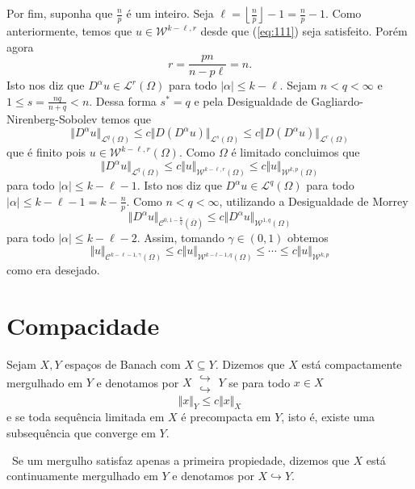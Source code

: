 \documentclass[a4paper, 11pt]{book}
\theoremstyle{definition}
\newcommand{\obs}{\noindent{\textbf{\textcolor{black}{\sffamily Observação:}}}~}
\newcommand{\cC}{\mathcal{C}}
\newcommand{\cL}{\mathcal{L}}
\newcommand{\cW}{\mathcal{W}}
\newcommand{\doublehookrightarrow}{\;\substack{\hookrightarrow \\ \hookrightarrow}\;}
\begin{document}
\begin{prf}
    Por fim, suponha que $\frac{n}{p}$ é um inteiro. Seja $\ell = \left\lfloor \frac{n}{p} \right\rfloor - 1 = \frac{n}{p} - 1$.
    Como anteriormente, temos que $u \in \cW^{k-\ell,r}$ desde que (\ref{eq:111}) seja satisfeito. Porém agora
    \[
        r = \frac{pn}{n - p\ell} = n.
    \]
    Isto nos diz que $D^\alpha u \in \cL^r(\Omega)$ para todo $|\alpha| \leqslant k - \ell$.
    Sejam $n < q < \infty$ e $1 \leqslant s = \frac{nq}{n + q} < n$. Dessa forma $s^* = q$ e pela Desigualdade de Gagliardo-Nirenberg-Sobolev temos que
    \[
        \Vert D^\alpha u \Vert_{\cL^q(\Omega)}\leqslant c\Vert D(D^\alpha u) \Vert_{\cL^s(\Omega)} \leqslant c \Vert D(D^\alpha u) \Vert_{\cL^r(\Omega)}
    \]
    que é finito pois $u \in \cW^{k-\ell,r}(\Omega)$.
    Como $\Omega$ é limitado concluimos que
    \[
        \Vert D^\alpha u \Vert_{\cL^q(\Omega)} \leqslant c \Vert u \Vert_{\cW^{k-\ell,r}(\Omega)} \leqslant c \Vert u \Vert_{\cW^{k,p}(\Omega)}
    \]
    para todo $|\alpha| \leqslant k - \ell - 1$. Isto nos diz que $D^\alpha u \in \cL^q(\Omega)$ para todo $|\alpha| \leqslant k - \ell - 1 = k - \frac{n}{p}$.
    Como $n < q < \infty$, utilizando a Desigualdade de Morrey
    \[
        \Vert D^\alpha u \Vert_{\cC^{0,1 - \frac{n}{q}}(\overline\Omega)} \leqslant c \Vert D^\alpha u \Vert_{\cW^{1,q}(\Omega)}
    \]
    para todo $|\alpha| \leqslant k - \ell - 2$.
    Assim, tomando $\gamma \in (0,1)$ obtemos
    \[
        \Vert u \Vert_{\cC^{k-\ell-1,\gamma}(\Omega)} \leqslant c\Vert u \Vert_{\cW^{k-l-1,q}(\Omega)} \leqslant \cdots \leqslant c \Vert u \Vert_{\cW^{k,p}}
    \]
    como era desejado.
\end{prf}

\section{Compacidade}

\begin{dbox}
    Sejam $X, Y$ espaços de Banach com $X \subseteq Y$. Dizemos que $X$ está compactamente mergulhado em $Y$ e denotamos por $X \doublehookrightarrow Y$
    se para todo $x \in X$
    \[
        \Vert x \Vert_{Y} \leqslant c \Vert x \Vert_X
    \]
    e se toda sequência limitada em $X$ é precompacta em $Y$, isto é, existe uma subsequência que converge em $Y$.
\end{dbox}

\obs Se um mergulho satisfaz apenas a primeira propiedade, dizemos que $X$ está continuamente mergulhado em $Y$ e denotamos por $X \hookrightarrow Y$.
\end{document}
